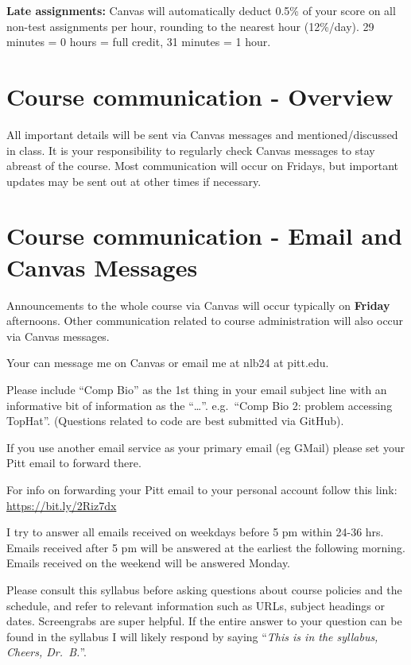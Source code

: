 \documentclass[
]{book}
\begin{document}
\textbf{Late assignments:} Canvas will automatically deduct 0.5\% of your score on all non-test assignments per hour, rounding to the nearest hour (12\%/day). 29 minutes = 0 hours = full credit, 31 minutes = 1 hour.

\hypertarget{course-communication---overview}{%
\chapter{Course communication - Overview}\label{course-communication---overview}}

All important details will be sent via Canvas messages and mentioned/discussed in class. It is your responsibility to regularly check Canvas messages to stay abreast of the course. Most communication will occur on Fridays, but important updates may be sent out at other times if necessary.

\hypertarget{email_and_canvas_msg}{%
\chapter{Course communication - Email and Canvas Messages}\label{email_and_canvas_msg}}

Announcements to the whole course via Canvas will occur typically on \textbf{Friday} afternoons. Other communication related to course administration will also occur via Canvas messages.

Your can message me on Canvas or email me at nlb24 at pitt.edu.

Please include ``Comp Bio'' as the 1st thing in your email subject line with an informative bit of information as the ``\ldots{}''. e.g.~``Comp Bio 2: problem accessing TopHat''. (Questions related to code are best submitted via GitHub).

If you use another email service as your primary email (eg GMail) please set your Pitt email to forward there.

For info on forwarding your Pitt email to your personal account follow this link: \url{https://bit.ly/2Riz7dx}

I try to answer all emails received on weekdays before 5 pm within 24-36 hrs. Emails received after 5 pm will be answered at the earliest the following morning. Emails received on the weekend will be answered Monday.

Please consult this syllabus before asking questions about course policies and the schedule, and refer to relevant information such as URLs, subject headings or dates. Screengrabs are super helpful. If the entire answer to your question can be found in the syllabus I will likely respond by saying ``\emph{This is in the syllabus, Cheers, Dr.~B.}''.
\end{document}
